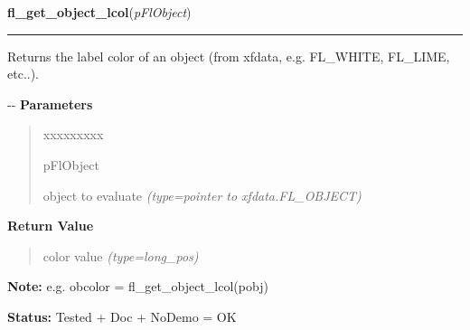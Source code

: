 \hspace{.8\funcindent}\begin{boxedminipage}{\funcwidth}

    \raggedright \textbf{fl\_get\_object\_lcol}(\textit{pFlObject})

    \vspace{-1.5ex}

    \rule{\textwidth}{0.5\fboxrule}
\setlength{\parskip}{2ex}

Returns the label color of an object (from xfdata, e.g. FL\_WHITE,
FL\_LIME, etc..).

-{}-
\setlength{\parskip}{1ex}
      \textbf{Parameters}
      \vspace{-1ex}

      \begin{quote}
        \begin{Ventry}{xxxxxxxxx}

          \item[pFlObject]


object to evaluate
            {\it (type=pointer to xfdata.FL\_OBJECT)}

        \end{Ventry}

      \end{quote}

      \textbf{Return Value}
    \vspace{-1ex}

      \begin{quote}

color value
      {\it (type=long\_pos)}

      \end{quote}

\textbf{Note:} 
e.g. obcolor = fl\_get\_object\_lcol(pobj)


\textbf{Status:} 
Tested + Doc + NoDemo = OK


    \end{boxedminipage}

    \label{xformslib:flbasic:fl_set_object_return}

    \vspace{0.5ex}

